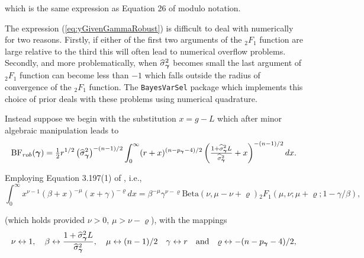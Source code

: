 \noindent which is the same expression as Equation 26 of \cite{Bayarri2012}
modulo notation.

The expression (\ref{eq:yGivenGammaRobust}) is difficult to deal with
numerically for two reasons. Firstly, if either of the first two arguments of
the ${}_2F_1$ function are large relative to the third this will often lead to
numerical overflow problems. Secondly, and more problematically, when
$\widehat{\sigma}_{\boldsymbol \gamma}^2$ becomes small the last argument of ${}_2F_1$
function can become less than $-1$ which falls outside the radius of
convergence of the ${}_2F_1$ function. The {\tt BayesVarSel} package which
implements this choice of prior deals with these problems using numerical
quadrature.

Instead suppose we begin with the substitution $x = g - L$ which after minor
algebraic manipulation leads to
$$
\displaystyle \mbox{BF}_{{rob}}({\boldsymbol \gamma})
= \tfrac{1}{2} r^{1/2} \left( \widehat{\sigma}_{\boldsymbol \gamma}^2\right)^{-(n-1)/2} 
\int_0^\infty  (r + x)^{(n - p_{\boldsymbol \gamma}-4)/2}
\left(  \tfrac{1 +  \widehat{\sigma}_{\boldsymbol \gamma}^2L}{\widehat{\sigma}_{\boldsymbol \gamma}^2} +  x \right)^{-(n-1)/2} dx.
$$

\noindent Employing Equation 3.197(1) of \cite{Gradshteyn2007}, i.e.,
$$
\int_0^\infty x^{\nu - 1}(\beta + x)^{-\mu}(x + \gamma)^{-\varrho} dx
= \beta^{-\mu}
\gamma^{\nu - \varrho} 
\mbox{Beta}(\nu,\mu - \nu + \varrho)
{}_2F_1(\mu,\nu;\mu+\varrho; 1 - \gamma/\beta),
$$

\noindent (which holds provided $\nu>0$, $\mu > \nu - \varrho$), with the
mappings
$$
\nu \leftrightarrow 1,
\quad 
\beta \leftrightarrow \frac{1 +  \widehat{\sigma}_{\boldsymbol \gamma}^2L}{\widehat{\sigma}_{\boldsymbol \gamma}^2},
\quad 
\mu \leftrightarrow (n-1)/2
\quad 
\gamma \leftrightarrow r
\quad \mbox{and} \quad 
\varrho \leftrightarrow -(n - p_{\boldsymbol \gamma}-4)/2,
$$

